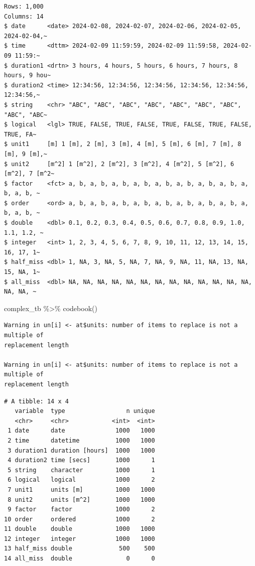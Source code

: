 \documentclass[
  letterpaper,
]{ctexbook}
\newenvironment{Shaded}{\begin{snugshade}}{\end{snugshade}}
\newcommand{\FunctionTok}[1]{\textcolor[rgb]{0.28,0.35,0.67}{#1}}
\newcommand{\NormalTok}[1]{\textcolor[rgb]{0.00,0.23,0.31}{#1}}
\newcommand{\SpecialCharTok}[1]{\textcolor[rgb]{0.37,0.37,0.37}{#1}}
\begin{document}
\begin{verbatim}
Rows: 1,000
Columns: 14
$ date      <date> 2024-02-08, 2024-02-07, 2024-02-06, 2024-02-05, 2024-02-04,~
$ time      <dttm> 2024-02-09 11:59:59, 2024-02-09 11:59:58, 2024-02-09 11:59:~
$ duration1 <drtn> 3 hours, 4 hours, 5 hours, 6 hours, 7 hours, 8 hours, 9 hou~
$ duration2 <time> 12:34:56, 12:34:56, 12:34:56, 12:34:56, 12:34:56, 12:34:56,~
$ string    <chr> "ABC", "ABC", "ABC", "ABC", "ABC", "ABC", "ABC", "ABC", "ABC~
$ logical   <lgl> TRUE, FALSE, TRUE, FALSE, TRUE, FALSE, TRUE, FALSE, TRUE, FA~
$ unit1     [m] 1 [m], 2 [m], 3 [m], 4 [m], 5 [m], 6 [m], 7 [m], 8 [m], 9 [m],~
$ unit2     [m^2] 1 [m^2], 2 [m^2], 3 [m^2], 4 [m^2], 5 [m^2], 6 [m^2], 7 [m^2~
$ factor    <fct> a, b, a, b, a, b, a, b, a, b, a, b, a, b, a, b, a, b, a, b, ~
$ order     <ord> a, b, a, b, a, b, a, b, a, b, a, b, a, b, a, b, a, b, a, b, ~
$ double    <dbl> 0.1, 0.2, 0.3, 0.4, 0.5, 0.6, 0.7, 0.8, 0.9, 1.0, 1.1, 1.2, ~
$ integer   <int> 1, 2, 3, 4, 5, 6, 7, 8, 9, 10, 11, 12, 13, 14, 15, 16, 17, 1~
$ half_miss <dbl> 1, NA, 3, NA, 5, NA, 7, NA, 9, NA, 11, NA, 13, NA, 15, NA, 1~
$ all_miss  <dbl> NA, NA, NA, NA, NA, NA, NA, NA, NA, NA, NA, NA, NA, NA, NA, ~
\end{verbatim}

\begin{Shaded}
\begin{Highlighting}[]
\NormalTok{complex\_tb }\SpecialCharTok{\%\textgreater{}\%}
  \FunctionTok{codebook}\NormalTok{()}
\end{Highlighting}
\end{Shaded}

\begin{verbatim}
Warning in un[i] <- at$units: number of items to replace is not a multiple of
replacement length

Warning in un[i] <- at$units: number of items to replace is not a multiple of
replacement length
\end{verbatim}

\begin{verbatim}
# A tibble: 14 x 4
   variable  type                 n unique
   <chr>     <chr>            <int>  <int>
 1 date      date              1000   1000
 2 time      datetime          1000   1000
 3 duration1 duration [hours]  1000   1000
 4 duration2 time [secs]       1000      1
 5 string    character         1000      1
 6 logical   logical           1000      2
 7 unit1     units [m]         1000   1000
 8 unit2     units [m^2]       1000   1000
 9 factor    factor            1000      2
10 order     ordered           1000      2
11 double    double            1000   1000
12 integer   integer           1000   1000
13 half_miss double             500    500
14 all_miss  double               0      0
\end{verbatim}
\end{document}
